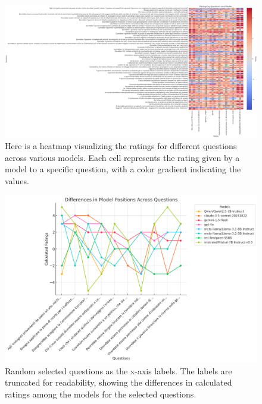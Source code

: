 \documentclass[10pt]{article}
\begin{document}
\begin{figure}[h!]
    \centering
    \includegraphics[width=\textwidth]{heatmap.png}
    \caption{Here is a heatmap visualizing the ratings for different questions across various models. Each cell represents the rating given by a model to a specific question, with a color gradient indicating the values.}
    \label{fig:heatmap}
\end{figure}

\begin{figure}[h!]
    \centering
    \includegraphics[width=\textwidth]{example_diff.png}
    \caption{Random selected questions as the x-axis labels. The labels are truncated for readability, showing the differences in calculated ratings among the models for the selected questions.}
    \label{fig:example_diff}
\end{figure}
\end{document}
